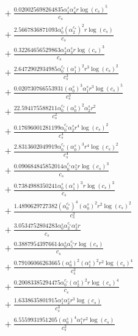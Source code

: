\documentclass[10pt]{article}
\begin{document}
\begin{align*}
&{}  + \frac{0.020025698264835 \alpha_{1}^s \alpha_{4}^s r \log{\left(c_{s} \right)}^{5}}{c_{s}} \\
&{}  + \frac{2.5667836871093 \alpha_{0}^s \left(\alpha_{2}^{c_s}\right)^{2} r \log{\left(c_{s} \right)}}{c_{s}} \\
&{}  + \frac{0.32264656529863 \alpha_{2}^s \alpha_{3}^s r \log{\left(c_{s} \right)}^{3}}{c_{s}} \\
&{}  + \frac{2.6472902934985 \alpha_{0}^{c_s} \left(\alpha_{1}^s\right)^{2} r^{3} \log{\left(c_{s} \right)}^{2}}{c_{s}^{3}} \\
&{}  + \frac{0.020730766553931 \left(\alpha_{0}^s\right)^{3} \alpha_{1}^s r^{3} \log{\left(c_{s} \right)}^{5}}{c_{s}^{3}} \\
&{}  + \frac{22.594175588211 \alpha_{0}^{c_s} \left(\alpha_{0}^s\right)^{2} \alpha_{2}^s r^{2}}{c_{s}^{2}} \\
&{}  + \frac{0.17696001281199 \alpha_{0}^{c_s} \alpha_{2}^s r^{4} \log{\left(c_{s} \right)}^{2}}{c_{s}^{4}} \\
&{}  + \frac{2.8313602049919 \alpha_{0}^{c_s} \left(\alpha_{0}^s\right)^{3} r^{4} \log{\left(c_{s} \right)}^{2}}{c_{s}^{4}} \\
&{}  + \frac{0.090684845852014 \alpha_{0}^{c_s} \alpha_{5}^s r \log{\left(c_{s} \right)}^{3}}{c_{s}} \\
&{}  + \frac{0.7384988350241 \alpha_{0}^s \left(\alpha_{1}^s\right)^{3} r \log{\left(c_{s} \right)}^{3}}{c_{s}} \\
&{}  + \frac{1.4890629727382 \left(\alpha_{0}^{c_s}\right)^{4} \left(\alpha_{0}^s\right)^{2} r^{2} \log{\left(c_{s} \right)}^{2}}{c_{s}^{2}} \\
&{}  + \frac{3.0534752804283 \alpha_{0}^s \alpha_{2}^{c_s} \alpha_{2}^s r}{c_{s}} \\
&{}  + \frac{0.38879543976614 \alpha_{0}^s \alpha_{5}^{c_s} r \log{\left(c_{s} \right)}}{c_{s}} \\
&{}  + \frac{0.79106066263665 \left(\alpha_{0}^s\right)^{2} \left(\alpha_{1}^s\right)^{2} r^{2} \log{\left(c_{s} \right)}^{4}}{c_{s}^{2}} \\
&{}  + \frac{0.20083385294475 \alpha_{0}^{c_s} \left(\alpha_{2}^s\right)^{2} r \log{\left(c_{s} \right)}^{4}}{c_{s}} \\
&{}  + \frac{1.6338635801915 \alpha_{1}^s \alpha_{2}^s r^{3} \log{\left(c_{s} \right)}}{c_{s}^{3}} \\
&{}  + \frac{6.5559931951205 \left(\alpha_{0}^s\right)^{4} \alpha_{1}^s r^{2} \log{\left(c_{s} \right)}}{c_{s}^{2}} \\

\end{align*}
\end{document}
